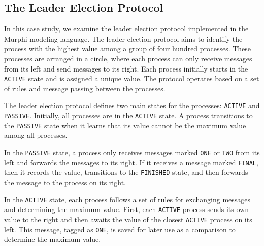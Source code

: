 
\subsection{The Leader Election Protocol}\label{subsec:the-leader-election-protocol}

In this case study, we examine the leader election protocol implemented in
the Murphi modeling language.
The leader election protocol aims to identify the process with the highest
value among a group of four hundred processes.
These processes are arranged in a circle, where each process can only receive
messages from its left and send messages to its right.
Each process initially starts in the \texttt{ACTIVE} state and is assigned a
unique value.
The protocol operates based on a set of rules and message passing between the
processes.

The leader election protocol defines two main states for the processes:
\texttt{ACTIVE} and \texttt{PASSIVE}.
Initially, all processes are in the \texttt{ACTIVE} state.
A process transitions to the \texttt{PASSIVE} state when it learns that its
value cannot be the maximum value among all processes.

In the \texttt{PASSIVE} state, a process only receives messages marked
\texttt{ONE} or \texttt{TWO} from its left and forwards the messages to its
right.
If it receives a message marked \texttt{FINAL}, then it records the value,
transitions to the \texttt{FINISHED} state, and then forwards the message
to the process on its right.

In the \texttt{ACTIVE} state, each process follows a set of rules for
exchanging messages and determining the maximum value.
First, each \texttt{ACTIVE} process sends its own value to the right and then
awaits the value of the closest \texttt{ACTIVE} process on its left.
This message, tagged as \texttt{ONE}, is saved for later use as a comparison
to determine the maximum value.

